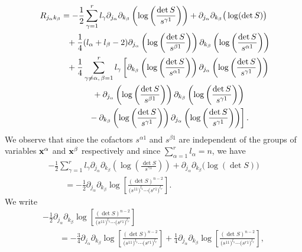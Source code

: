\documentclass[pdftex]{sigma}
\numberwithin{equation}{section}
\newcommand{\jalpha}{j_{\alpha}}
\newcommand{\kbeta}{k_{\beta}}
\newcommand{\lbeta}{l_{\beta}}
\newcommand{\lalpha}{l_{\alpha}}
\newcommand{\lgamma}{l_{\gamma}}
\begin{document}
\begin{gather}
R_{\jalpha \kbeta}=-\frac{1}{2}\sum_{\gamma =1}^{r}\lgamma \partial_{\jalpha}\partial_{\kbeta}\left(\log\left(\frac{\det S}{s^{\gamma 1}}\right)\right)+\partial_{\jalpha}\partial_{\kbeta}\big(\log(\det S)\big)\nonumber\\
\hphantom{R_{\jalpha \kbeta}=}{} + \frac{1}{4}(\lalpha+\lbeta-2) \partial_{\jalpha}\left(\log\left(\frac{\det S}{s^{\beta 1}}\right)\right)\partial_{\kbeta}\left(\log\left(\frac{\det S}{s^{\alpha 1}}\right)\right)\nonumber\\
\hphantom{R_{\jalpha \kbeta}=}{}+\frac{1}{4}\sum_{\gamma \neq \alpha, \,\beta=1}^{r}\lgamma \left[\partial_{\kbeta}\left(\log\left(\frac{\det S}{s^{\alpha 1}}\right)\right) \partial_{\jalpha}\left(\log\left(\frac{\det S}{s^{\gamma 1}}\right)\right)\right.\nonumber\\
\hphantom{R_{\jalpha \kbeta}=}{}
+\partial_{\jalpha}\left(\log\left(\frac{\det S}{s^{\beta 1}}\right)\right)\partial_{\kbeta}\left(\log\left(\frac{\det S}{s^{\gamma 1}}\right)\right)\nonumber\\
\left.\hphantom{R_{\jalpha \kbeta}=}{} -\partial_{\kbeta}\left(\log\left(\frac{\det S}{s^{\gamma 1}}\right)\right)\partial_{\jalpha}\left(\log\left(\frac{\det S}{s^{\gamma 1}}\right)\right)\right].\label{Riccialmostfinal}
\end{gather}
We observe that since the cofactors $s^{\alpha 1}$ and $s^{\beta 1}$ are independent of the groups of variables ${\bf x}^{\alpha}$ and ${\bf x}^{\beta}$ respectively and since $\sum\limits_{\alpha=1}^{r}\lalpha = n$, we have
\begin{gather*}
-\frac{1}{2}\sum_{\gamma =1}^{r}\lgamma \partial_{\jalpha}\partial_{\kbeta}\left(\log\left(\frac{\det S}{s^{\gamma 1}}\right)\right)+\partial_{\jalpha}\partial_{\kbeta}\big(\log(\det S)\big)\\
\qquad{} =-\frac{1}{2}\partial_{j_{\alpha}}\partial_{k_{\beta}}\log\left[\frac{(\det S)^{n-2}}{\big(s^{11}\big)^{l_{1}}\cdots \big(s^{r1}\big)^{l_{r}}}\right].
\end{gather*}
We write
\begin{gather}
-\frac{1}{2}\partial_{j_{\alpha}}\partial_{k_{\beta}}\log\left[\frac{(\det S)^{n-2}}{\big(s^{11}\big)^{l_{1}}\cdots \big(s^{r1}\big)^{l_{r}}}\right]\nonumber\\
\qquad{} =-\frac{3}{4}\partial_{j_{\alpha}}\partial_{k_{\beta}}\log\left[\frac{(\det S)^{n-2}}{\big(s^{11}\big)^{l_{1}}\cdots \big(s^{r1}\big)^{l_{r}}}\right] +\frac{1}{4}\partial_{j_{\alpha}}\partial_{k_{\beta}}\log\left[\frac{(\det S)^{n-2}}{\big(s^{11}\big)^{l_{1}}\cdots \big(s^{r1}\big)^{l_{r}}}\right],\label{simplif}
\end{gather}
\end{document}
